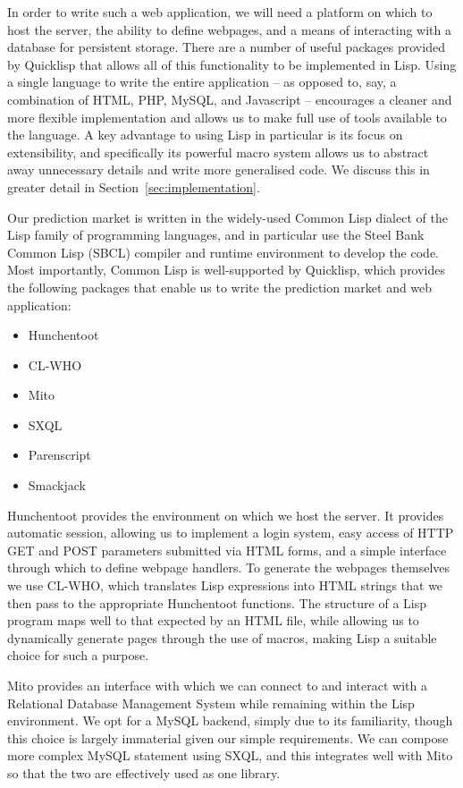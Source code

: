 In order to write such a web application, we will need a platform on which to
host the server, the ability to define webpages, and a means of interacting
with a database for persistent storage. There are a number of useful packages
provided by Quicklisp that allows all of this functionality to be implemented
in Lisp. Using a single language to write the entire application -- as opposed
to, say, a combination of HTML, PHP, MySQL, and Javascript -- encourages a
cleaner and more flexible implementation and allows us to make full use of
tools available to the language. A key advantage to using Lisp in particular is
its focus on extensibility, and specifically its powerful macro system allows
us to abstract away unnecessary details and write more generalised code. We
discuss this in greater detail in Section~\ref{sec:implementation}.

Our prediction market is written in the widely-used Common Lisp dialect of the
Lisp family of programming languages, and in particular use the Steel Bank
Common Lisp (SBCL) compiler and runtime environment to develop the code. Most
importantly, Common Lisp is well-supported by Quicklisp, which provides the
following packages that enable us to write the prediction market and web
application:

\begin{itemize}
	\item Hunchentoot \cite{Hunchentoot}
	\item CL-WHO \cite{CL-WHO}
	\item Mito \cite{Mito}
	\item SXQL \cite{SXQL}
	\item Parenscript \cite{Parenscript}
	\item Smackjack \cite{Smackjack}
\end{itemize}

Hunchentoot provides the environment on which we host the server. It provides
automatic session, allowing us to implement a login system, easy access of HTTP
GET and POST parameters submitted via HTML forms, and a simple interface
through which to define webpage handlers. To generate the webpages themselves
we use CL-WHO, which translates Lisp expressions into HTML strings that we then
pass to the appropriate Hunchentoot functions. The structure of a Lisp program
maps well to that expected by an HTML file, while allowing us to dynamically
generate pages through the use of macros, making Lisp a suitable choice for
such a purpose.

Mito provides an interface with which we can connect to and interact with a
Relational Database Management System while remaining within the Lisp
environment. We opt for a MySQL backend, simply due to its familiarity, though
this choice is largely immaterial given our simple requirements. We can compose
more complex MySQL statement using SXQL, and this integrates well with Mito so
that the two are effectively used as one library.

